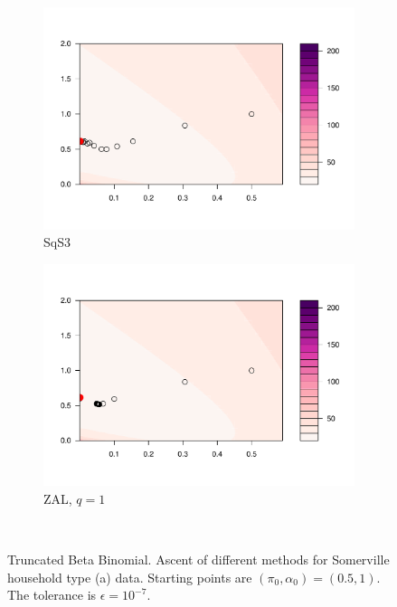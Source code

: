 \documentclass[12pt]{article}
\begin{document}
\begin{figure}
\begin{subfigure}[h]{0.45\textwidth}
        \includegraphics[width = \textwidth]{plots/beta-contour_SqS2.pdf}
        \caption{SqS3}
        \label{}
    \end{subfigure}
    \begin{subfigure}[h]{0.45\textwidth}
        \centering
        \includegraphics[width = \textwidth]{plots/beta-contour_ZAL1.pdf}
        \caption{ZAL, $q=1$}
        \label{}
    \end{subfigure}\\
    \caption{Truncated Beta Binomial. Ascent of different methods for Somerville household type (a) data. Starting points are $(\pi_0, \alpha_0) = (0.5, 1)$. The tolerance is $\epsilon = 10^{-7}$.}
    \label{fig:beta-contour}
\end{figure}
\end{document}
